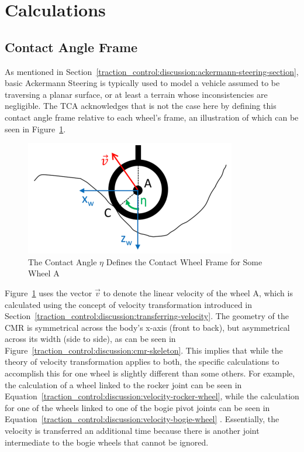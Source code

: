 \acresetall
\section{Calculations}
\subsection{Contact Angle Frame}\label{traction_control:discussion:contact-angle-section}
As mentioned in Section~\ref{traction_control:discussion:ackermann-steering-section}, basic Ackermann Steering is typically used to model a vehicle assumed to be traversing a planar surface, or at least a terrain whose inconsistencies are negligible. The \ac{TCA} acknowledges that is not the case here by defining this contact angle frame relative to each wheel's frame, an illustration of which can be seen in Figure~\ref{traction_control:discussion:contact-angle}.

\begin{figure}[H]
	\centering
	\includegraphics[width=.8\textwidth]{sections/discussion/images/contact_angle.png}
	\caption{The Contact Angle $\eta$ Defines the Contact Wheel Frame for Some Wheel A \cite{tractl}}
	\label{traction_control:discussion:contact-angle}
\end{figure}

Figure~\ref{traction_control:discussion:contact-angle} uses the vector $\vec{v}$ to denote the linear velocity of the wheel A, which is calculated using the concept of velocity transformation introduced in Section~\ref{traction_control:discussion:transferring-velocity}. The geometry of the \ac{CMR} is symmetrical across the body's x-axis (front to back), but asymmetrical across its width (side to side), as can be seen in Figure~\ref{traction_control:discussion:cmr-skeleton}. This implies that while the theory of velocity transformation applies to both, the specific calculations to accomplish this for one wheel is slightly different than some others. For example, the calculation of a wheel linked to the rocker joint can be seen in Equation~\ref{traction_control:discussion:velocity-rocker-wheel}, while the calculation for one of the wheels linked to one of the bogie pivot joints can be seen in Equation~\ref{traction_control:discussion:velocity-bogie-wheel} \cite{tractl}. Essentially, the velocity is transferred an additional time because there is another joint intermediate to the bogie wheels that cannot be ignored. \\


